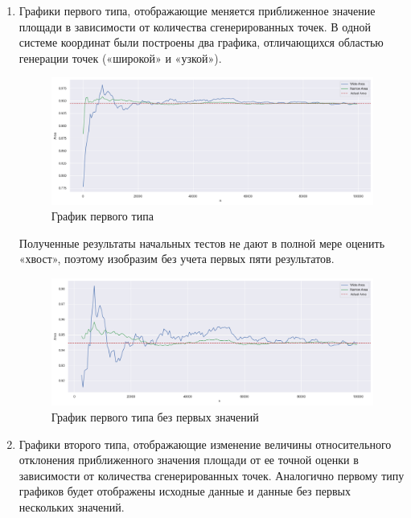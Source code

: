 \documentclass[11pt,a4paper]{scrarticle}
\theoremstyle{definition}
\begin{document}
\begin{enumerate}
	\item Графики первого типа, отображающие меняется приближенное значение площади в зависимости от количества сгенерированных точек. В одной системе координат были построены два графика, отличающихся областью генерации точек («широкой» и «узкой»).
	      \begin{figure}[htp]
		      \centering
		      \includegraphics[width=\textwidth]{../static/area.png}
		      \caption{График первого типа}
		      \label{fig:area}
	      \end{figure}
	      \FloatBarrier

	      Полученные результаты начальных тестов не дают в полной мере оценить «хвост», поэтому изобразим без учета первых пяти результатов.
	      \begin{figure}[htp]
		      \centering
		      \includegraphics[width=\textwidth]{../static/area_reduced.png}
		      \caption{График первого типа без первых значений}
		      \label{fig:area-reduced}
	      \end{figure}
	      \FloatBarrier

	\item Графики второго типа, отображающие изменение величины относительного отклонения приближенного значения площади от ее точной оценки в зависимости от количества сгенерированных точек. Аналогично первому типу графиков будет отображены исходные данные и данные без первых нескольких значений.


\end{enumerate}
\end{document}
